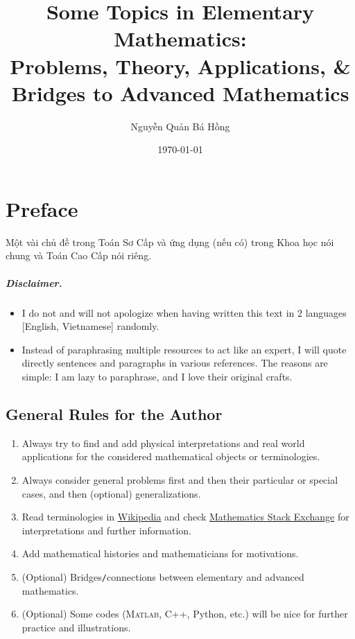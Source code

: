 \documentclass[oneside]{book}
\title{Some Topics in Elementary Mathematics:\\Problems, Theory, Applications, \& Bridges to Advanced Mathematics}
\author{Nguyễn Quản Bá Hồng}
\date{\today}
\numberwithin{equation}{section}
\begin{document}
\maketitle
\setcounter{secnumdepth}{3}
\setcounter{tocdepth}{3}
\tableofcontents


\chapter*{Preface}
Một vài chủ đề trong Toán Sơ Cấp và ứng dụng (nếu có) trong Khoa học nói chung và Toán Cao Cấp nói riêng.


\paragraph*{Disclaimer.}
\begin{itemize}
	\item I do not and will not apologize when having written this text in 2 languages [English, Vietnamese] randomly.
	\item Instead of paraphrasing multiple resources to act like an expert, I will quote directly sentences and paragraphs in various references. The reasons are simple: I am lazy to paraphrase, and I love their original crafts.
\end{itemize}

\section*{General Rules for the Author}
\begin{enumerate}
	\item Always try to find and add physical interpretations and real world applications for the considered mathematical objects or terminologies.
	\item Always consider general problems first and then their particular or special cases, and then (optional) generalizations.
	\item Read terminologies in \href{https://www.wikipedia.org/}{Wikipedia} and check \href{https://math.stackexchange.com/}{Mathematics Stack Exchange} for interpretations and further information.
	\item Add mathematical histories and mathematicians for motivations.
	\item (Optional) Bridges\texttt{/}connections between elementary and advanced mathematics.
	\item (Optional) Some codes (\textsc{Matlab}, C++, Python, etc.) will be nice for further practice and illustrations.
\end{enumerate}
\end{document}
